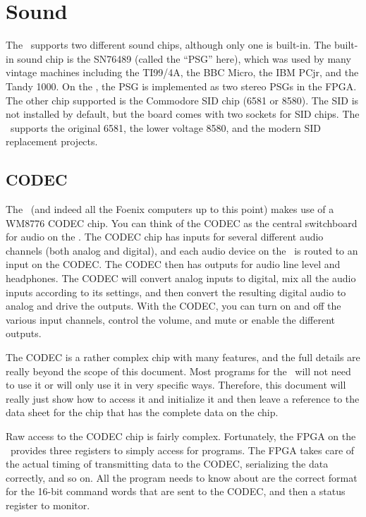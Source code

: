 \chapter{Sound}

The \jr\ supports two different sound chips, although only one is built-in. The built-in sound chip is the SN76489 (called the ``PSG'' here), which was used by many vintage machines including the TI99/4A, the BBC Micro, the IBM PCjr, and the Tandy 1000. On the \jr, the PSG is implemented as two stereo PSGs in the FPGA. The other chip supported is the Commodore SID chip (6581 or 8580). The SID is not installed by default, but the board comes with two sockets for SID chips. The \jr\ supports the original 6581, the lower voltage 8580, and the modern SID replacement projects.

\section*{CODEC}

The \jr\ (and indeed all the Foenix computers up to this point) makes use of a WM8776 CODEC chip. You can think of the CODEC as the central switchboard for audio on the \jr. The CODEC chip has inputs for several different audio channels (both analog and digital), and each audio device on the \jr\ is routed to an input on the CODEC. The CODEC then has outputs for audio line level and headphones. The CODEC will convert analog inputs to digital, mix all the audio inputs according to its settings, and then convert the resulting digital audio to analog and drive the outputs. With the CODEC, you can turn on and off the various input channels, control the volume, and mute or enable the different outputs.

The CODEC is a rather complex chip with many features, and the full details are really beyond the scope of this document. Most programs for the \jr\ will not need to use it or will only use it in very specific ways. Therefore, this document will really just show how to access it and initialize it and then leave a reference to the data sheet for the chip that has the complete data on the chip.

Raw access to the CODEC chip is fairly complex. Fortunately, the FPGA on the \jr\ provides three registers to simply access for programs. The FPGA takes care of the actual timing of transmitting data to the CODEC, serializing the data correctly, and so on. All the program needs to know about are the correct format for the 16-bit command words that are sent to the CODEC, and then a status register to monitor.

